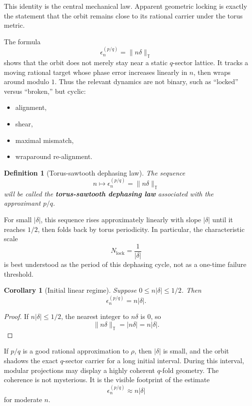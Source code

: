 \documentclass[11pt]{article}
\newtheorem{definition}[theorem]{Definition}
\newtheorem{corollary}[theorem]{Corollary}
\newcommand{\T}{\mathbb{T}}
\begin{document}
This identity is the central mechanical law. Apparent geometric locking is exactly the statement that the orbit remains close to its rational carrier under the torus metric.

The formula
\[
\epsilon_n^{(p/q)}=\lVert n\delta\rVert_{\T}
\]
shows that the orbit does not merely stay near a static $q$-sector lattice. It tracks a moving rational target whose phase error increases linearly in $n$, then wraps around modulo $1$. Thus the relevant dynamics are not binary, such as ``locked'' versus ``broken,'' but cyclic:
\begin{itemize}
    \item alignment,
    \item shear,
    \item maximal mismatch,
    \item wraparound re-alignment.
\end{itemize}

\begin{definition}[Torus-sawtooth dephasing law]
The sequence
\[
n\mapsto \epsilon_n^{(p/q)}=\lVert n\delta\rVert_{\T}
\]
will be called the \textbf{torus-sawtooth dephasing law} associated with the approximant $p/q$.
\end{definition}

For small $|\delta|$, this sequence rises approximately linearly with slope $|\delta|$ until it reaches $1/2$, then folds back by torus periodicity. In particular, the characteristic scale
\[
N_{\mathrm{lock}}=\frac{1}{|\delta|}
\]
is best understood as the period of this dephasing cycle, not as a one-time failure threshold.

\begin{corollary}[Initial linear regime]
Suppose $0\le n|\delta|\le 1/2$. Then
\[
\epsilon_n^{(p/q)}=n|\delta|.
\]
\end{corollary}

\begin{proof}
If $n|\delta|\le 1/2$, the nearest integer to $n\delta$ is $0$, so
\[
\lVert n\delta\rVert_{\T}=|n\delta|=n|\delta|.
\]
\end{proof}

If $p/q$ is a good rational approximation to $\rho$, then $|\delta|$ is small, and the orbit shadows the exact $q$-sector carrier for a long initial interval. During this interval, modular projections may display a highly coherent $q$-fold geometry. The coherence is not mysterious. It is the visible footprint of the estimate
\[
\epsilon_n^{(p/q)}\approx n|\delta|
\]
for moderate $n$.
\end{document}

